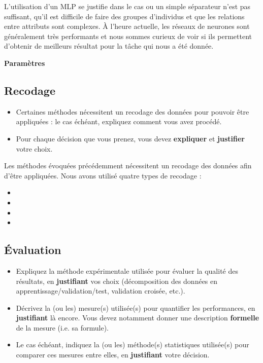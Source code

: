 \documentclass{ceri/sty/rapport}
\begin{document}
L'utilisation d'un MLP se justifie dans le cas ou un simple séparateur n'est pas suffisant, qu'il est difficile de faire des groupes d'individus et que les relations entre attributs sont complexes. À l'heure actuelle, les réseaux de neurones sont généralement très performants et nous sommes curieux de voir si ils permettent d'obtenir de meilleurs résultat pour la tâche qui nous a été donnée.

\textbf{Paramètres}

\subsection{Recodage}
\begin{itemize}
	\item Certaines méthodes nécessitent un recodage des données pour pouvoir être appliquées : le cas échéant, expliquez comment vous avez procédé.
	\item Pour chaque décision que vous prenez, vous devez \textbf{expliquer} et \textbf{justifier} votre choix.
\end{itemize}

Les méthodes évoquées précédemment nécessitent un recodage des données afin d'être appliquées. Nous avons utilisé quatre types de recodage :
\begin{itemize}
    \item 
    \item 
    \item 
    \item 
\end{itemize}



\subsection{Évaluation}
\begin{itemize}
	\item Expliquez la méthode expérimentale utilisée pour évaluer la qualité des résultats, en \textbf{justifiant} vos choix (décomposition des données en apprentissage/validation/test, validation croisée, etc.).
	\item Décrivez la (ou les) mesure(s) utilisée(s) pour quantifier les performances, en \textbf{justifiant} là encore. Vous devez notamment donner une description \textbf{formelle} de la mesure (i.e. sa formule).
	\item Le cas échéant, indiquez la (ou les) méthode(s) statistiques utilisée(s) pour comparer ces mesures entre elles, en \textbf{justifiant} votre décision.
\end{itemize}
\end{document}
